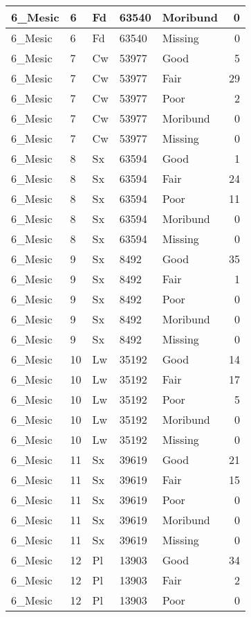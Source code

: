\documentclass[
]{article}
\begin{document}
\begin{tabular}{l|l|l|l|l|r}
\hline
6\_Mesic & 6 & Fd & 63540 & Moribund & 0\\
\hline
6\_Mesic & 6 & Fd & 63540 & Missing & 0\\
\hline
6\_Mesic & 7 & Cw & 53977 & Good & 5\\
\hline
6\_Mesic & 7 & Cw & 53977 & Fair & 29\\
\hline
6\_Mesic & 7 & Cw & 53977 & Poor & 2\\
\hline
6\_Mesic & 7 & Cw & 53977 & Moribund & 0\\
\hline
6\_Mesic & 7 & Cw & 53977 & Missing & 0\\
\hline
6\_Mesic & 8 & Sx & 63594 & Good & 1\\
\hline
6\_Mesic & 8 & Sx & 63594 & Fair & 24\\
\hline
6\_Mesic & 8 & Sx & 63594 & Poor & 11\\
\hline
6\_Mesic & 8 & Sx & 63594 & Moribund & 0\\
\hline
6\_Mesic & 8 & Sx & 63594 & Missing & 0\\
\hline
6\_Mesic & 9 & Sx & 8492 & Good & 35\\
\hline
6\_Mesic & 9 & Sx & 8492 & Fair & 1\\
\hline
6\_Mesic & 9 & Sx & 8492 & Poor & 0\\
\hline
6\_Mesic & 9 & Sx & 8492 & Moribund & 0\\
\hline
6\_Mesic & 9 & Sx & 8492 & Missing & 0\\
\hline
6\_Mesic & 10 & Lw & 35192 & Good & 14\\
\hline
6\_Mesic & 10 & Lw & 35192 & Fair & 17\\
\hline
6\_Mesic & 10 & Lw & 35192 & Poor & 5\\
\hline
6\_Mesic & 10 & Lw & 35192 & Moribund & 0\\
\hline
6\_Mesic & 10 & Lw & 35192 & Missing & 0\\
\hline
6\_Mesic & 11 & Sx & 39619 & Good & 21\\
\hline
6\_Mesic & 11 & Sx & 39619 & Fair & 15\\
\hline
6\_Mesic & 11 & Sx & 39619 & Poor & 0\\
\hline
6\_Mesic & 11 & Sx & 39619 & Moribund & 0\\
\hline
6\_Mesic & 11 & Sx & 39619 & Missing & 0\\
\hline
6\_Mesic & 12 & Pl & 13903 & Good & 34\\
\hline
6\_Mesic & 12 & Pl & 13903 & Fair & 2\\
\hline
6\_Mesic & 12 & Pl & 13903 & Poor & 0\\

\end{tabular}
\end{document}
